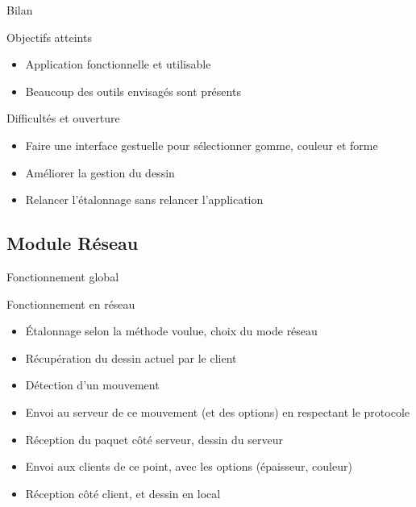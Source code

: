\documentclass{beamer}
\begin{document}
            \begin{frame}{Bilan}
                  \begin{exampleblock}{Objectifs atteints}
                        \begin{itemize}
                        \item Application fonctionnelle et utilisable
                        \item Beaucoup des outils envisagés sont présents
                        \end{itemize}
                  \end{exampleblock}
                  \pause
                  \begin{alertblock}{Difficultés et ouverture}
                        \begin{itemize}
                        \item Faire une interface gestuelle pour sélectionner gomme, couleur et forme
                        \item Améliorer la gestion du dessin
                        \item Relancer l'étalonnage sans relancer l'application
                        \end{itemize}
                  \end{alertblock}
            \end{frame}

      \subsection{Module Réseau}
            \begin{frame}{Fonctionnement global}
                  \begin{block}{Fonctionnement en réseau}
                        \begin{itemize}
                        \item Étalonnage selon la méthode voulue, choix du mode réseau
                        \item Récupération du dessin actuel par le client
                        \item Détection d'un mouvement
                        \item Envoi au serveur de ce mouvement (et des options) en respectant le protocole
                        \item Réception du paquet côté serveur, dessin du serveur
                        \item Envoi aux clients de ce point, avec les options (épaisseur, couleur)
                        \item Réception côté client, et dessin en local
                        \end{itemize}
                  \end{block}
            \end{frame}
            
\end{document}

